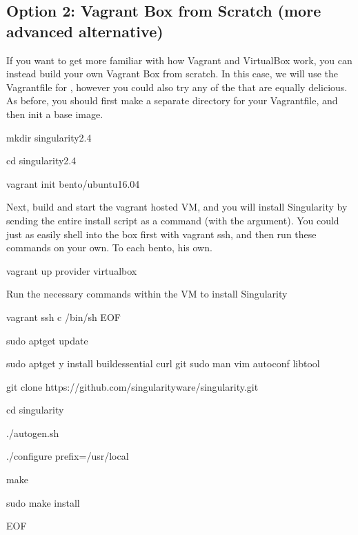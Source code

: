 \documentclass[letterpaper,10pt,english]{sphinxmanual}
\begin{document}
\subsection{Option 2: Vagrant Box from Scratch (more advanced alternative)}
\label{\detokenize{installation:option-2-vagrant-box-from-scratch-more-advanced-alternative}}
If you want to get more familiar with how Vagrant and VirtualBox work, you can instead build your own Vagrant Box from scratch. In this case, we will use the Vagrantfile for , however you could also try any of the  that are equally delicious. As before, you should first make a separate directory for your Vagrantfile, and then init a base image.

%
\begin{sphinxVerbatim}[commandchars=\\\{\}]
mkdir singularity\PYGZhy{}2.4

cd singularity\PYGZhy{}2.4

vagrant init bento/ubuntu\PYGZhy{}16.04
\end{sphinxVerbatim}

Next, build and start the vagrant hosted VM, and you will install Singularity by sending the entire install script as a command (with the  argument). You could just as easily shell into the box first with vagrant ssh, and then run these commands on your own. To each bento, his own.

%
\begin{sphinxVerbatim}[commandchars=\\\{\}]
vagrant up \PYGZhy{}\PYGZhy{}provider virtualbox


\PYGZsh{} Run the necessary commands within the VM to install Singularity

vagrant ssh \PYGZhy{}c /bin/sh \PYGZlt{}\PYGZlt{}EOF

    sudo apt\PYGZhy{}get update

    sudo apt\PYGZhy{}get \PYGZhy{}y install build\PYGZhy{}essential curl git sudo man vim autoconf libtool

    git clone https://github.com/singularityware/singularity.git

    cd singularity

    ./autogen.sh

    ./configure \PYGZhy{}\PYGZhy{}prefix=/usr/local

    make

    sudo make install

EOF
\end{sphinxVerbatim}
\end{document}
